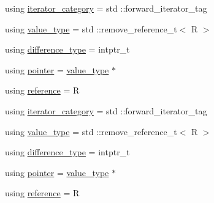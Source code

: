 \begin{DoxyCompactItemize}
\item 
using \mbox{\hyperlink{structrah_1_1iterator__facade_3_01_i_00_01_r_00_01std_01_1_1output__iterator__tag_01_4_a465bbb8a7a2ae321b8183e3c9e727423}{iterator\+\_\+category}} = std \+::forward\+\_\+iterator\+\_\+tag
\item 
using \mbox{\hyperlink{structrah_1_1iterator__facade_3_01_i_00_01_r_00_01std_01_1_1output__iterator__tag_01_4_ad112e27b0b6caafdfab6cd47bbc66e73}{value\+\_\+type}} = std \+::remove\+\_\+reference\+\_\+t$<$ R $>$
\item 
using \mbox{\hyperlink{structrah_1_1iterator__facade_3_01_i_00_01_r_00_01std_01_1_1output__iterator__tag_01_4_a3564661cd457ec25b43c0f7a831d1224}{difference\+\_\+type}} = intptr\+\_\+t
\item 
using \mbox{\hyperlink{structrah_1_1iterator__facade_3_01_i_00_01_r_00_01std_01_1_1output__iterator__tag_01_4_aaa99676a12d594e70c36d9c6fc3deb52}{pointer}} = \mbox{\hyperlink{structrah_1_1iterator__facade_3_01_i_00_01_r_00_01std_01_1_1output__iterator__tag_01_4_ad112e27b0b6caafdfab6cd47bbc66e73}{value\+\_\+type}} $\ast$
\item 
using \mbox{\hyperlink{structrah_1_1iterator__facade_3_01_i_00_01_r_00_01std_01_1_1output__iterator__tag_01_4_a372d828166749a15dafbeabecc0674d9}{reference}} = R
\item 
using \mbox{\hyperlink{structrah_1_1iterator__facade_3_01_i_00_01_r_00_01std_01_1_1output__iterator__tag_01_4_a465bbb8a7a2ae321b8183e3c9e727423}{iterator\+\_\+category}} = std \+::forward\+\_\+iterator\+\_\+tag
\item 
using \mbox{\hyperlink{structrah_1_1iterator__facade_3_01_i_00_01_r_00_01std_01_1_1output__iterator__tag_01_4_ad112e27b0b6caafdfab6cd47bbc66e73}{value\+\_\+type}} = std \+::remove\+\_\+reference\+\_\+t$<$ R $>$
\item 
using \mbox{\hyperlink{structrah_1_1iterator__facade_3_01_i_00_01_r_00_01std_01_1_1output__iterator__tag_01_4_a3564661cd457ec25b43c0f7a831d1224}{difference\+\_\+type}} = intptr\+\_\+t
\item 
using \mbox{\hyperlink{structrah_1_1iterator__facade_3_01_i_00_01_r_00_01std_01_1_1output__iterator__tag_01_4_aaa99676a12d594e70c36d9c6fc3deb52}{pointer}} = \mbox{\hyperlink{structrah_1_1iterator__facade_3_01_i_00_01_r_00_01std_01_1_1output__iterator__tag_01_4_ad112e27b0b6caafdfab6cd47bbc66e73}{value\+\_\+type}} $\ast$
\item 
using \mbox{\hyperlink{structrah_1_1iterator__facade_3_01_i_00_01_r_00_01std_01_1_1output__iterator__tag_01_4_a372d828166749a15dafbeabecc0674d9}{reference}} = R
\end{DoxyCompactItemize}

